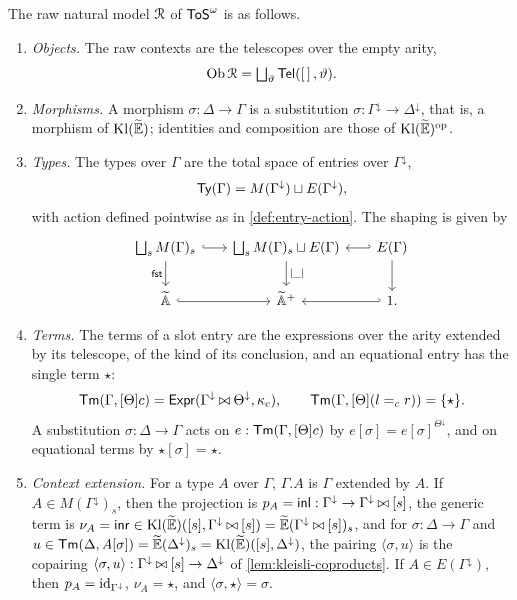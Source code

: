 \begin{proposition}\label{prop:tos-raw}
    The raw natural model $\mathcal{R}$ of $\mathsf{ToS}^\omega$ is as follows.
    \begin{enumerate}
        \item \emph{Objects.} The raw contexts are the telescopes over the empty arity,
        $$\operatorname{Ob} \mathcal{R} = \textstyle\bigsqcup_{\vartheta} \mathsf{Tel}(\left[\,\right], \vartheta).$$
        \item \emph{Morphisms.} A morphism $\sigma : \Delta \to \Gamma$ is a substitution $\sigma : \Gamma^{\downarrow} \to \Delta^{\downarrow}$, that is, a morphism of $\mathrm{Kl}(\widetilde{\mathbb{E}})$; identities and composition are those of $\mathrm{Kl}(\widetilde{\mathbb{E}})^{\mathrm{op}}$.
        \item \emph{Types.} The types over $\Gamma$ are the total space of entries over $\Gamma^{\downarrow}$,
        $$\mathsf{Ty}(\Gamma) = M(\Gamma^{\downarrow}) \sqcup E(\Gamma^{\downarrow}),$$
        with action defined pointwise as in \cref{def:entry-action}. The shaping is given by
        \[\begin{tikzcd}[column sep=scriptsize]
        	{\bigsqcup_sM(\Gamma)_s} & {\bigsqcup_sM(\Gamma)_s \sqcup E(\Gamma)} & {E(\Gamma)} \\
        	{\widetilde{\mathbb{A}}} & {\widetilde{\mathbb{A}}^+} & {1.}
        	\arrow[hook, from=1-1, to=1-2]
        	\arrow["\fst"', from=1-1, to=2-1]
        	\arrow["{|\_|}", from=1-2, to=2-2]
        	\arrow[hook', from=1-3, to=1-2]
        	\arrow[from=1-3, to=2-3]
        	\arrow[hook, from=2-1, to=2-2]
        	\arrow[hook', from=2-3, to=2-2]
        \end{tikzcd}\]
        \item \emph{Terms.} The terms of a slot entry are the expressions over the arity extended by its telescope, of the kind of its conclusion, and an equational entry has the single term $\star$:
        \[
            \mathsf{Tm}(\Gamma, [\Theta]c) = \mathsf{Expr}(\Gamma^{\downarrow} \mathbin{\bowtie} \Theta^{\downarrow}, \kappa_c), \qquad \mathsf{Tm}(\Gamma, [\Theta](l =_c r)) = \{\star\}.
        \]
        A substitution $\sigma : \Delta \to \Gamma$ acts on $e : \mathsf{Tm}(\Gamma, [\Theta]c)$ by $e[\sigma] = e[\sigma]^{\Theta^{\downarrow}}$, and on equational terms by $\star[\sigma] = \star$.
        \item \emph{Context extension.} For a type $A$ over $\Gamma$, $\Gamma.A$ is $\Gamma$ extended by $A$. If $A \in M(\Gamma^{\downarrow})_s$, then the projection is $p_A = \mathsf{inl} : \Gamma^{\downarrow} \to \Gamma^{\downarrow} \mathbin{\bowtie} [s]$, the generic term is $\nu_A = \mathsf{inr} \in \mathrm{Kl}(\widetilde{\mathbb{E}})([s], \Gamma^{\downarrow} \mathbin{\bowtie} [s]) = \widetilde{\mathbb{E}}(\Gamma^{\downarrow} \mathbin{\bowtie} [s])_s$, and for $\sigma : \Delta \to \Gamma$ and $u \in \mathsf{Tm}(\Delta, A[\sigma]) = \widetilde{\mathbb{E}}(\Delta^{\downarrow})_s = \mathrm{Kl}(\widetilde{\mathbb{E}})([s], \Delta^{\downarrow})$, the pairing $\langle \sigma, u \rangle$ is the copairing $\langle \sigma, u \rangle : \Gamma^{\downarrow} \mathbin{\bowtie} [s] \to \Delta^{\downarrow}$ of \cref{lem:kleisli-coproducts}. If $A \in E(\Gamma^{\downarrow})$, then $p_A = \mathrm{id}_{\Gamma^{\downarrow}}$, $\nu_A = \star$, and $\langle \sigma, \star \rangle = \sigma$.
    \end{enumerate}
\end{proposition}

